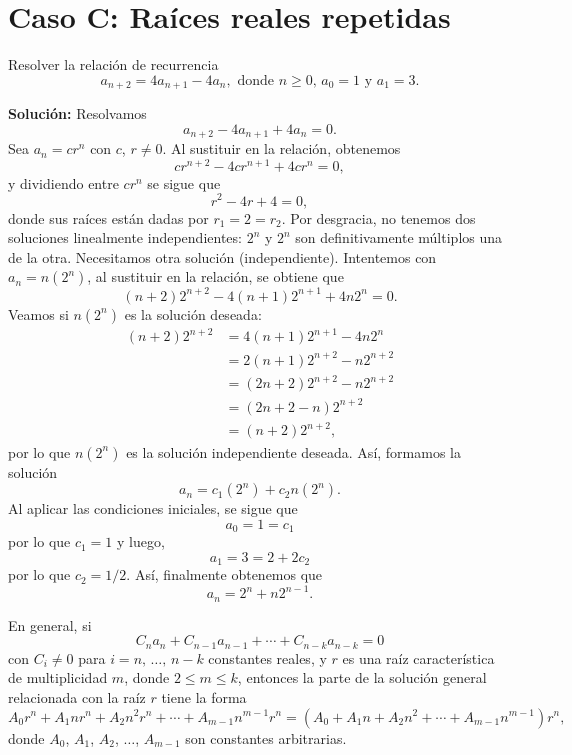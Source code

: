 \section*{Caso C: Raíces reales repetidas}

\begin{myexample}
    Resolver la relación de recurrencia
    $$a_{n+2} = 4a_{n+1} - 4a_n, \text{ donde } n \geq 0, \, a_0 = 1 \text{ y } a_1 = 3.$$

    \tcblower
    \textbf{\color{jblueleft}Solución:} Resolvamos
    $$a_{n+2} - 4a_{n+1} + 4a_n = 0.$$
    Sea $a_n = cr^n$ con $c$, $r \neq 0$. Al sustituir en la relación, obtenemos
    $$cr^{n+2} - 4cr^{n+1} + 4cr^{n} = 0,$$
    y dividiendo entre $cr^{n}$ se sigue que
    $$r^2 - 4r + 4 = 0,$$
    donde sus raíces están dadas por $r_1 = 2 = r_2$. Por desgracia, no tenemos dos soluciones linealmente independientes: $2^n$ y $2^n$ son definitivamente múltiplos una de la otra. Necesitamos otra solución (independiente). Intentemos con $a_n = n(2^n)$, al sustituir en la relación, se obtiene que
    $$(n + 2)2^{n+2} - 4(n+1)2^{n+1} + 4n2^n = 0.$$
    Veamos si $n(2^n)$ es la solución deseada:
    \begin{align*}
        (n + 2)2^{n+2} & = 4(n+1)2^{n+1} - 4n2^n \\
        & = 2(n + 1)2^{n + 2} - n 2^{n+2} \\
        & = (2n+2)2^{n+2} - n2^{n+2} \\
        & = (2n + 2 - n)2^{n+2} \\
        & = (n + 2)2^{n+2},
    \end{align*}
    por lo que $n(2^n)$ es la solución independiente deseada. Así, formamos la solución
    $$a_n = c_1 (2^n) + c_2 n(2^n).$$
    Al aplicar las condiciones iniciales, se sigue que
    $$a_0 = 1 = c_1$$
    por lo que $c_1 = 1$ y luego,
    $$a_1 = 3 = 2 + 2c_2$$
    por lo que $c_2 = 1/2$. Así, finalmente obtenemos que
    $$a_n = 2^n + n2^{n-1}.$$
\end{myexample}

\begin{BOX}
    En general, si
    $$C_na_n + C_{n-1}a_{n-1} + \cdots + C_{n-k}a_{n-k} = 0$$
    con $C_i \neq 0$ para $i = n, \, \dots, \, n-k$ constantes reales, y $r$ es una raíz característica de multiplicidad $m$, donde $2 \leq m \leq k$, entonces la parte de la solución general relacionada con la raíz $r$ tiene la forma
    $$A_0r^n + A_1nr^n + A_2n^2r^n + \cdots + A_{m-1}n^{m-1}r^n = \left( A_0 + A_1n + A_2n^2 + \cdots + A_{m-1}n^{m-1} \right)r^n,$$
    donde $A_0$, $A_1$, $A_2$, $\dots$, $A_{m-1}$ son constantes arbitrarias.
\end{BOX}

